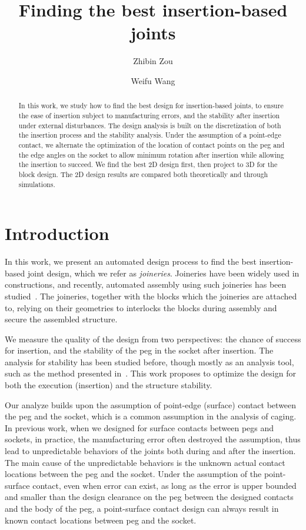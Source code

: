 \documentclass[letterpaper, 10 pt, conference]{ieeeconf}
\title{Finding the best insertion-based joints}
\author{Zhibin Zou \and Weifu Wang}
\date{}
\begin{document}
\maketitle

\begin{abstract}
In this work, we study how to find the best design for insertion-based joints, to ensure the ease of insertion subject to manufacturing errors, and the stability after insertion under external disturbances. The design analysis is built on the discretization of both the insertion process and the stability analysis. Under the assumption of a point-edge contact, we alternate the optimization of the location of contact points on the peg and the edge angles on the socket to allow minimum rotation after insertion while allowing the insertion to succeed. We find the best 2D design first, then project to 3D for the block design. The 2D design results are compared both theoretically and through simulations. 
\end{abstract}

\section{Introduction}

In this work, we present an automated design process to find the best insertion-based joint design, which we refer as {\em joineries}. Joineries have been widely used in constructions, and recently, automated assembly using such joineries has been studied~\cite{Zhang2018-interlocking}. The joineries, together with the blocks which the joineries are attached to, relying on their geometries to interlocks the blocks during assembly and secure the assembled structure. 

We measure the quality of the design from two perspectives: the chance of success for insertion, and the stability of the peg in the socket after insertion. The analysis for stability has been studied before, though mostly as an analysis tool, such as the method presented in~\cite{Lensgraf20}. This work proposes to optimize the design for both the execution (insertion) and the structure stability. 

Our analyze builds upon the assumption of point-edge (surface) contact between the peg and the socket, which is a common assumption in the analysis of caging. In previous work, when we designed for surface contacts between pegs and sockets, in practice, the manufacturing error often destroyed the assumption, thus lead to unpredictable behaviors of the joints both during and after the insertion. The main cause of the unpredictable behaviors is the unknown actual contact locations between the peg and the socket. Under the assumption of the point-surface contact, even when error can exist, as long as the error is upper bounded and smaller than the design clearance on the peg between the designed contacts and the body of the peg, a point-surface contact design can always result in known contact locations between peg and the socket. 
\end{document}
